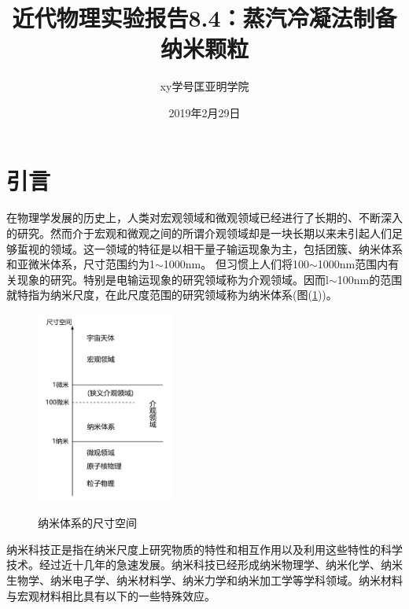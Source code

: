 \documentclass[a4paper]{article}
\title{近代物理实验报告8.4：蒸汽冷凝法制备纳米颗粒}
\author{xy\quad 学号\quad 匡亚明学院}
\date{2019年2月29日}
\begin{document}
\maketitle


\section{引言}
在物理学发展的历史上，人类对宏观领域和微观领域已经进行了长期的、不断深入的研究。然而介于宏观和微观之间的所谓介观领域却是一块长期以来未引起人们足够蜇视的领域。这一领域的特征是以相干量子输运现象为主，包括团簇、纳米体系和亚微米体系，尺寸范围约为1$\sim$1000nm。
但习惯上人们将100$\sim$1000nm范围内有关现象的研究。特别是电输运现象的研究领域称为介观领域。因而l$\sim$100nm的范围就特指为纳米尺度，在此尺度范围的研究领域称为纳米体系(图(\ref{fig1}))。
\begin{figure}[!h]
\centering
\includegraphics[width=0.4\textwidth]{fig/fig1.pdf}\\
\caption{纳米体系的尺寸空间}\label{fig1}
\end{figure}

纳米科技正是指在纳米尺度上研究物质的特性和相互作用以及利用这些特性的科学技术。经过近十几年的急速发展。纳米科技已经形成纳米物理学、纳米化学、纳米生物学、纳米电子学、纳米材料学、纳米力学和纳米加工学等学科领域。纳米材料与宏观材料相比具有以下的一些特殊效应。
\end{document}
